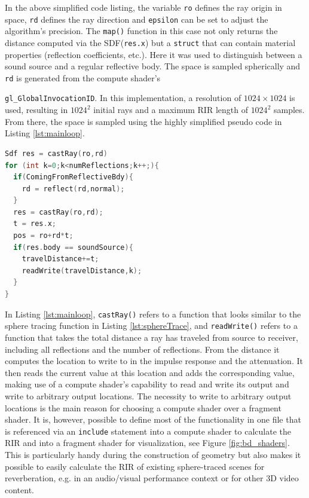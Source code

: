\documentclass[twoside,a4paper]{article}
\begin{document}
In the above simplified code listing, the variable \texttt{ro} defines the ray origin in space, \texttt{rd} defines the ray direction and \texttt{epsilon} can be set to adjust the algorithm's precision. The \texttt{map()} function in this case not only returns the distance computed via the SDF(\texttt{res.x}) but a \texttt{struct} that can contain material properties (reflection coefficients, etc.). Here it was used to distinguish between a sound source and a regular reflective body.
The space is sampled spherically and \texttt{rd} is generated from the compute shader's \

 \texttt{gl\_GlobalInvocationID}. In this implementation, a resolution of $1024 \times 1024$ is used, resulting in $1024^2$ initial rays and a maximum RIR length of $1024^2$ samples.
From there, the space is sampled using the highly simplified pseudo code in Listing \ref{lst:mainloop}.




\begin{lstlisting}[float,floatplacement=H, language=C, caption={\it GLSL pseudo code for sampling the space and writing to the RIR.},captionpos=b, label=lst:mainloop]
Sdf res = castRay(ro,rd)
for (int k=0;k<numReflections;k++;){
  if(ComingFromReflectiveBdy){
    rd = reflect(rd,normal);
  }
  res = castRay(ro,rd);
  t = res.x;
  pos = ro+rd*t;
  if(res.body == soundSource){
    travelDistance+=t;
    readWrite(travelDistance,k);
  }
}

\end{lstlisting}

In Listing \ref{lst:mainloop}, \texttt{castRay()} refers to a function that looks similar to the sphere tracing function in Listing \ref{lst:sphereTrace}, and \texttt{readWrite()} refers to a function that takes the total distance a ray has traveled from source to receiver, including all reflections and the number of reflections. From the distance it computes the location to write to in the impulse response and the attenuation. It then reads the current value at this location and adds the corresponding value, making use of a compute shader's capability to read and write its output and write to arbitrary output locations. The necessity to write to arbitrary output locations is the main reason for choosing a compute shader over a fragment shader. It is, however, possible to define most of the functionality in one file that is referenced via an \texttt{include} statement into a compute shader to calculate the RIR and into a fragment shader for visualization, see Figure \ref{fig:bd_shaders}. This is particularly handy during the construction of geometry but also makes it possible to easily calculate the RIR of existing sphere-traced scenes for reverberation, e.g. in an audio/visual performance context or for other 3D video content.
\end{document}
